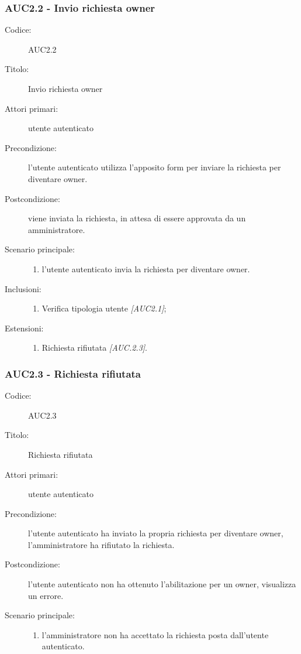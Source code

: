 \documentclass[casi-duso]{subfiles}
\begin{document}
\subsubsection{AUC2.2 - Invio richiesta owner}%
\label{subsub:AUC2.2}
\begin{description}
  \item[Codice:] AUC2.2
  \item[Titolo:] Invio richiesta owner
  \item[Attori primari:] utente autenticato
  \item[Precondizione:] l'utente autenticato utilizza l'apposito form per inviare la richiesta per diventare owner.
  \item[Postcondizione:] viene inviata la richiesta, in attesa di essere approvata da un amministratore.
  \item[Scenario principale:]
  \begin{enumerate}
    \item l'utente autenticato invia la richiesta per diventare owner.
  \end{enumerate}
  \item[Inclusioni:]
  \begin{enumerate}
    \item Verifica tipologia utente \emph{[AUC2.1]};
  \end{enumerate}
  \item[Estensioni:]
  \begin{enumerate}
    \item Richiesta rifiutata \emph{[AUC.2.3]}.
  \end{enumerate}
\end{description}

\subsubsection{AUC2.3 - Richiesta rifiutata}%
\label{subsub:AUC2.3}
\begin{description}
  \item[Codice:] AUC2.3
  \item[Titolo:] Richiesta rifiutata
  \item[Attori primari:] utente autenticato
  \item[Precondizione:] l'utente autenticato ha inviato la propria richiesta per diventare owner, l'amministratore ha rifiutato la richiesta.
  \item[Postcondizione:] l'utente autenticato non ha ottenuto l'abilitazione per un owner, visualizza un errore.
  \item[Scenario principale:]
  \begin{enumerate}
    \item l'amministratore non ha accettato la richiesta posta dall'utente autenticato.
  \end{enumerate}
\end{description}
\end{document}
